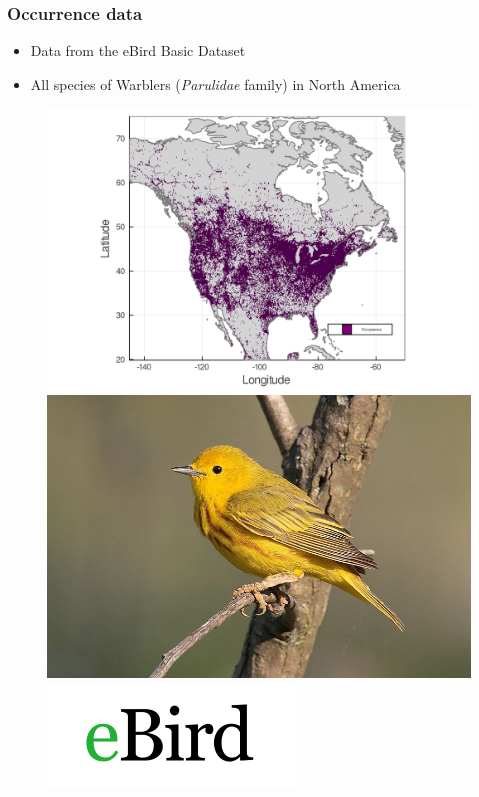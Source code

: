 \documentclass[10pt, aspectratio=1610]{beamer}
\begin{document}
\begin{frame}
  \frametitle{Occurrence data}
  \hspace*{0.5cm}
  \begin{itemize}
    \item Data from the eBird Basic Dataset
    \item All species of Warblers (\textit{Parulidae} family) in North America
  \end{itemize}
  \begin{figure}
    \centering
    \hspace*{-1cm}\includegraphics[scale=0.135]{fig/01_raw_singlesp.png}%
    \includegraphics[scale=0.60]{fig/yellow-warbler.jpg}
    \includegraphics[scale=1.3]{fig/logo-ebird.png}
  \end{figure}
\end{frame}
\end{document}
